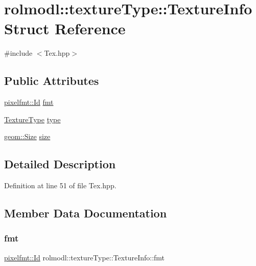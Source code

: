 \hypertarget{structrolmodl_1_1texture_type_1_1_texture_info}{}\section{rolmodl\+::texture\+Type\+::Texture\+Info Struct Reference}
\label{structrolmodl_1_1texture_type_1_1_texture_info}


{\ttfamily \#include $<$Tex.\+hpp$>$}

\subsection*{Public Attributes}
\begin{DoxyCompactItemize}
\item 
\mbox{\hyperlink{namespacerolmodl_1_1pixelfmt_a96282713e4465ba9211c8fd3a702b52b}{pixelfmt\+::\+Id}} \mbox{\hyperlink{structrolmodl_1_1texture_type_1_1_texture_info_a1cebf84ab9545fdbbb6239d6eba66f83}{fmt}}
\item 
\mbox{\hyperlink{namespacerolmodl_a7090840be12da261b3a8af5852e9f4fd}{Texture\+Type}} \mbox{\hyperlink{structrolmodl_1_1texture_type_1_1_texture_info_af9cd3800d1e121e3a365b7f017d88277}{type}}
\item 
\mbox{\hyperlink{structrolmodl_1_1geom_1_1_size}{geom\+::\+Size}} \mbox{\hyperlink{structrolmodl_1_1texture_type_1_1_texture_info_acb1baad1cee55d6feabfa0750cfcb56a}{size}}
\end{DoxyCompactItemize}


\subsection{Detailed Description}


Definition at line 51 of file Tex.\+hpp.



\subsection{Member Data Documentation}
\mbox{\label{structrolmodl_1_1texture_type_1_1_texture_info_a1cebf84ab9545fdbbb6239d6eba66f83}} 
\subsubsection{\texorpdfstring{fmt}{fmt}}
{\footnotesize\ttfamily \mbox{\hyperlink{namespacerolmodl_1_1pixelfmt_a96282713e4465ba9211c8fd3a702b52b}{pixelfmt\+::\+Id}} rolmodl\+::texture\+Type\+::\+Texture\+Info\+::fmt}



